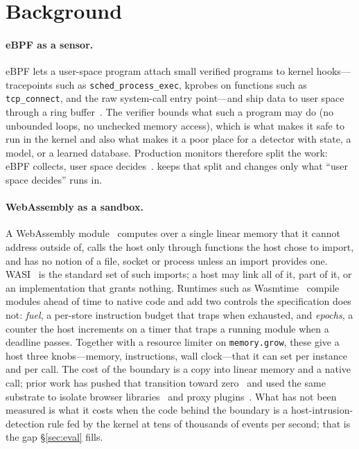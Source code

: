 \section{Background}
\label{sec:background}

\paragraph{eBPF as a sensor.}
{\sloppy eBPF lets a user-space program attach small verified programs to kernel
hooks---tracepoints such as \texttt{sched\_process\_exec}, kprobes on
functions such as \texttt{tcp\_connect}, and the raw system-call entry
point---and ship data to user space through a ring buffer~\cite{ebpf-intro}.
The verifier bounds what such a program may do (no unbounded loops, no
unchecked memory access), which is what makes it safe to run in the kernel
and also what makes it a poor place for a detector with state, a model, or
a learned database. Production monitors therefore split the work: eBPF
collects, user space decides~\cite{falco,tetragon,tracee}. \sys keeps that
split and changes only what ``user space decides'' runs in.\par}

\paragraph{WebAssembly as a sandbox.}
A WebAssembly module~\cite{wasm-spec} computes over a single linear memory
that it cannot address outside of, calls the host only through functions
the host chose to import, and has no notion of a file, socket or process
unless an import provides one. WASI~\cite{wasi} is the standard set of such
imports; a host may link all of it, part of it, or an implementation that
grants nothing. Runtimes such as Wasmtime~\cite{wasmtime} compile modules
ahead of time to native code and add two controls the specification does
not: \emph{fuel}, a per-store instruction budget that traps when exhausted,
and \emph{epochs}, a counter the host increments on a timer that traps a
running module when a deadline passes. Together with a resource limiter on
\texttt{memory.grow}, these give a host three knobs---memory, instructions,
wall clock---that it can set per instance and per call. The cost of the
boundary is a copy into linear memory and a native call; prior work has
pushed that transition toward zero~\cite{wasmboxc} and used the same
substrate to isolate browser libraries~\cite{rlbox} and proxy
plugins~\cite{proxy-wasm}. What has not been measured is what it costs
when the code behind the boundary is a host-intrusion-detection rule fed by
the kernel at tens of thousands of events per second; that is the gap
\S\ref{sec:eval} fills.

